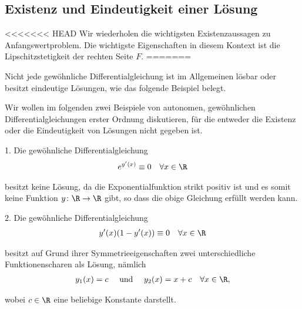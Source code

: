\documentclass[letterpaper,10pt,english]{jupyterBook}
\begin{document}
\subsection{Existenz und Eindeutigkeit einer Lösung}
\label{\detokenize{ode/repetition:existenz-und-eindeutigkeit-einer-losung}}
<<<<<<< HEAD
Wir wiederholen die wichtigsten Existenzaussagen zu Anfangswertproblem. Die wichtigste Eigenschaften in diesem Kontext ist die Lipschitzstetigkeit der rechten Seite \(F\).
\label{ode/repetition:definition-3}
=======
\par
Nicht jede gewöhnliche Differentialgleichung ist im Allgemeinen lösbar oder besitzt eindeutige Lösungen, wie das folgende Beispiel belegt.
\label{ode/repetition:example-7}
\begin{example}{}{}



\par
Wir wollen im folgenden zwei Beispiele von autonomen, gewöhnlichen Differentialgleichungen erster Ordnung diskutieren, für die entweder die Existenz oder die Eindeutigkeit von Lösungen nicht gegeben ist.

\par
1. Die gewöhnliche Differentialgleichung
\begin{align*}
e^{y'(x)} \equiv 0 \quad \forall x \in \R
\end{align*}
\par
besitzt keine Lösung, da die Exponentialfunktion strikt positiv ist und es somit keine Funktion \(y \colon \R \rightarrow \R\) gibt, so dass die obige Gleichung erfüllt werden kann.

\par
2. Die gewöhnliche Differentialgleichung
\begin{align*}
y'(x)(1-y'(x)) \equiv 0 \quad \forall x \in \R
\end{align*}
\par
besitzt auf Grund ihrer Symmetrieeigenschaften zwei unterschiedliche Funktionenscharen als Lösung, nämlich
\begin{align*}
y_1(x) = c \quad \text{ und } \quad y_2(x) = x + c \quad \forall x \in \R,
\end{align*}
\par
wobei \(c \in \R\) eine beliebige Konstante darstellt.
\end{example}
\end{document}
